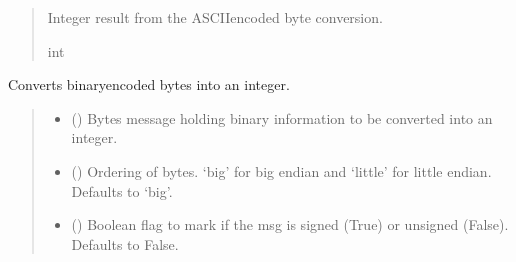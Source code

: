 \documentclass[letterpaper,10pt,english]{sphinxmanual}
\begin{document}
\begin{fulllineitems}
\begin{fulllineitems}
\begin{quote}
\begin{description}
\sphinxAtStartPar
Integer result from the ASCII\sphinxhyphen{}encoded byte conversion.

\sphinxAtStartPar
int

\end{description}\end{quote}

\end{fulllineitems}


\begin{fulllineitems}
\label{\detokenize{PodPacketHandling:PodPacketHandling.POD_Packets.BinaryBytesToInt}}
\pysigstartsignatures
{}
\pysigstopsignatures
\sphinxAtStartPar
Converts binary\sphinxhyphen{}encoded bytes into an integer.
\begin{quote}\begin{description}
\begin{itemize}
\item {} 
\sphinxAtStartPar
{} () \textendash{} Bytes message holding binary information to be converted into an integer.

\item {} 
\sphinxAtStartPar
{} (\sphinxstyleliteralemphasis{\sphinxupquote{, }}) \textendash{} Ordering of bytes. ‘big’ for big endian and ‘little’ for little                 endian. Defaults to ‘big’.

\item {} 
\sphinxAtStartPar
{} (\sphinxstyleliteralemphasis{\sphinxupquote{, }}) \textendash{} Boolean flag to mark if the msg is signed (True) or unsigned (False).                 Defaults to False.


\end{itemize}
\end{description}
\end{quote}
\end{fulllineitems}
\end{fulllineitems}
\end{document}
